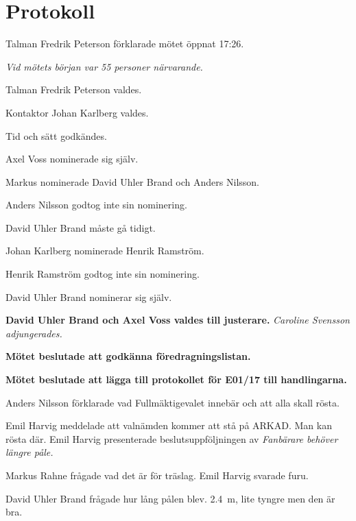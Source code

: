 \documentclass[10pt]{article}
\def\mo{Fredrik Peterson}
\def\ms{Johan Karlberg}
\begin{document}
\section*{Protokoll}

\begin{paragrafer}
Talman {\mo} förklarade mötet öppnat 17:26.

\emph{Vid mötets början var 55 personer närvarande.}

Talman {\mo} valdes.

Kontaktor {\ms} valdes.

Tid och sätt godkändes.

Axel Voss nominerade sig själv.

Markus nominerade David Uhler Brand och Anders Nilsson.

Anders Nilsson godtog inte sin nominering.

David Uhler Brand måste gå tidigt.

Johan Karlberg nominerade Henrik Ramström.

Henrik Ramström godtog inte sin nominering.

David Uhler Brand nominerar sig själv.

\textbf{David Uhler Brand och Axel Voss valdes till justerare.}
\emph{Caroline Svensson adjungerades.}


\textbf{Mötet beslutade att godkänna föredragningslistan.}

\textbf{Mötet beslutade att lägga till protokollet för E01/17 till handlingarna.}

Anders Nilsson förklarade vad Fullmäktigevalet innebär och att alla skall rösta.

Emil Harvig meddelade att valnämden kommer att stå på ARKAD. Man kan rösta där.
Emil Harvig presenterade beslutsuppföljningen av \emph{Fanbärare behöver längre påle.}

Markus Rahne frågade vad det är för träslag. Emil Harvig svarade furu.

David Uhler Brand frågade hur lång pålen blev. \SI{2.4}{m}, lite tyngre men den är bra.


\end{paragrafer}
\end{document}
